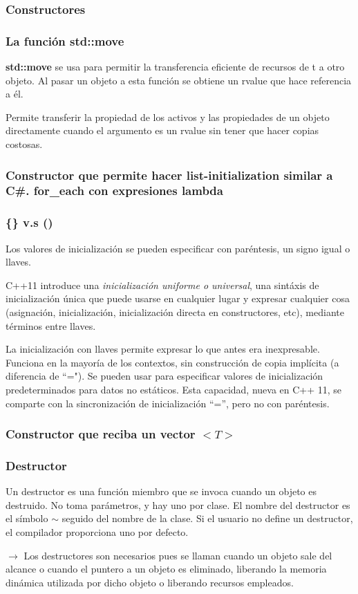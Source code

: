 \documentclass{beamer}
\begin{document}
	\begin{frame}
		\frametitle{Constructores}
		
	\end{frame}
	
	\begin{frame}
		\frametitle{La funci\'on std::move}
		\textbf{std::move} se usa para permitir la transferencia eficiente de recursos de t a otro objeto. Al pasar un objeto a esta función se obtiene un rvalue que hace referencia a él. 
		
		Permite transferir la propiedad de los activos y las propiedades de un objeto directamente cuando el argumento es un rvalue sin tener que hacer copias costosas.
	\end{frame}

	\begin{frame}
		\frametitle{Constructor que permite hacer list-initialization similar a C\#. for\_each con expresiones lambda}
	
	\end{frame}

	\begin{frame}
		\frametitle{\{\} v.s ()}
		Los valores de inicialización se pueden especificar con paréntesis, un signo igual o llaves.
		
		C++11 introduce una \textit{inicialización uniforme o universal}, una sint\'axis de inicialización única que puede usarse en cualquier lugar y expresar cualquier cosa (asignación, inicialización, inicialización directa en constructores, etc), mediante t\'erminos entre llaves.
		
		La inicialización con llaves permite expresar lo que antes era inexpresable. Funciona en la mayoría de los contextos, sin construcción de copia implícita (a diferencia de ``="). Se pueden usar para especificar valores de inicialización predeterminados para datos no estáticos. Esta capacidad, nueva en C++ 11, se comparte con la sincronización de inicialización “=”, pero no con paréntesis.
	\end{frame}

	\begin{frame}
		\frametitle{Constructor que reciba un vector $ <T> $}
			
	\end{frame}

	\begin{frame}
		\frametitle{Destructor}
		Un destructor es una función miembro que se invoca cuando un objeto es destruido. No toma parámetros, y hay uno por clase. El nombre del destructor es el s\'imbolo $ \sim $ seguido del nombre de la clase. Si el usuario no define un destructor, el compilador proporciona uno por defecto.
		
		$\rightarrow$ Los destructores son necesarios pues se llaman cuando un objeto sale del alcance o cuando el puntero a un objeto es eliminado, liberando la memoria dinámica utilizada por dicho objeto o liberando recursos empleados. 
	\end{frame}
	
\end{document}
